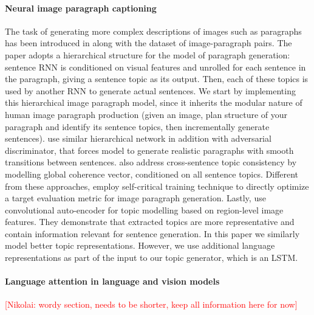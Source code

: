 \documentclass[11pt,a4paper]{article}
\newcommand{\kibitz}[2]{\ifnum\Comments=1\textcolor{#1}{#2}\fi}
\newcommand{\nikolai}[1]{\kibitz{red}      {[Nikolai: #1]}}
\begin{document}
\paragraph{Neural image paragraph captioning}
The task of generating more complex descriptions of images such as paragraphs has been introduced in  along with the dataset of image-paragraph pairs.
The paper adopts a hierarchical structure for the model of paragraph generation: sentence RNN is conditioned on visual features and unrolled for each sentence in the paragraph, giving a sentence topic as its output.
Then, each of these topics is used by another RNN to generate actual sentences.
We start by implementing this hierarchical image paragraph model, since it inherits the modular nature of human image paragraph production (given an image, plan structure of your paragraph and identify its sentence topics, then incrementally generate sentences). %
 use similar hierarchical network in addition with adversarial discriminator, that forces model to generate realistic paragraphs with smooth transitions between sentences.
 also address cross-sentence topic consistency by modelling global coherence vector, conditioned on all sentence topics.
Different from these approaches,  employ self-critical training technique \cite{selfcritical2016} to directly optimize a target evaluation metric for image paragraph generation.
Lastly,  use convolutional auto-encoder for topic modelling based on region-level image features. They demonstrate that extracted topics are more representative and contain information relevant for sentence generation.
In this paper we similarly model better topic representations. However, we use additional language representations as part of the input to our topic generator, which is an LSTM.

\paragraph{Language attention in language and vision models}
\nikolai{wordy section, needs to be shorter, keep all information here for now}
\end{document}
